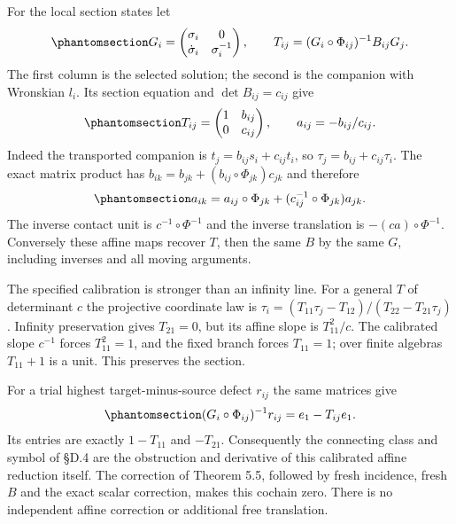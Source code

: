 \documentclass[
  english,
  11pt,
  reqno]{amsart}
\begin{document}
For the local section states let
\begin{equation}\protect\phantomsection\label{eq:gg-affine-adapted-cauchy}{
 G_i=
 \begin{pmatrix}\sigma_i&0\\\dot\sigma_i&\sigma_i^{-1}\end{pmatrix},
 \qquad
 T_{ij}=(G_i\circ\Phi_{ij})^{-1}B_{ij}G_j .
}\end{equation} The first column is the selected solution; the second is
the companion with Wronskian \(l_i\). Its section equation and
\(\det B_{ij}=c_{ij}\) give
\begin{equation}\protect\phantomsection\label{eq:gg-affine-translation-from-source}{
 T_{ij}=\begin{pmatrix}1&b_{ij}\\0&c_{ij}\end{pmatrix},
 \qquad a_{ij}=-b_{ij}/c_{ij}.
}\end{equation} Indeed the transported companion is
\(t_j=b_{ij}s_i+c_{ij}t_i\), so \(\tau_j=b_{ij}+c_{ij}\tau_i\). The
exact matrix product has \(b_{ik}=b_{jk}+(b_{ij}\circ\Phi_{jk})c_{jk}\)
and therefore
\begin{equation}\protect\phantomsection\label{eq:gg-affine-translation-cocycle}{
 a_{ik}=a_{ij}\circ\Phi_{jk}
                  +(c_{ij}^{-1}\circ\Phi_{jk})a_{jk}.
}\end{equation} The inverse contact unit is \(c^{-1}\circ\Phi^{-1}\) and
the inverse translation is \(-(ca)\circ\Phi^{-1}\). Conversely these
affine maps recover \(T\), then the same \(B\) by the same \(G\),
including inverses and all moving arguments.

The specified calibration is stronger than an infinity line. For a
general \(T\) of determinant \(c\) the projective coordinate law is
\(\tau_i=(T_{11}\tau_j-T_{12})/(T_{22}-T_{21}\tau_j)\). Infinity
preservation gives \(T_{21}=0\), but its affine slope is \(T_{11}^2/c\).
The calibrated slope \(c^{-1}\) forces \(T_{11}^2=1\), and the fixed
branch forces \(T_{11}=1\); over finite algebras \(T_{11}+1\) is a unit.
This preserves the section.

For a trial highest target-minus-source defect \(r_{ij}\) the same
matrices give
\begin{equation}\protect\phantomsection\label{eq:gg-affine-obstruction-cochain}{
 (G_i\circ\Phi_{ij})^{-1}r_{ij}=e_1-T_{ij}e_1 .
}\end{equation} Its entries are exactly \(1-T_{11}\) and \(-T_{21}\).
Consequently the connecting class and symbol of §D.4 are the obstruction
and derivative of this calibrated affine reduction itself. The
correction of Theorem 5.5, followed by fresh incidence, fresh \(B\) and
the exact scalar correction, makes this cochain zero. There is no
independent affine correction or additional free translation.
\end{document}
